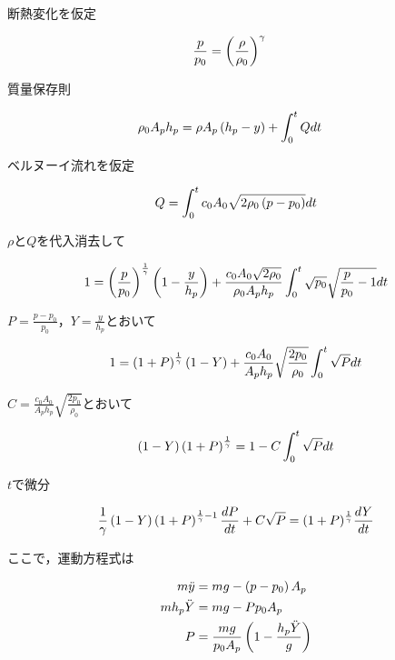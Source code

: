 \documentclass{jsarticle}
\begin{document}
断熱変化を仮定

\begin{align}
  \frac{p}{p_0} &= \left({\frac{\rho}{\rho_0}}\right)^{\gamma}  
\end{align}

質量保存則

\begin{align}
  \rho_0 A_p h_p &= \rho A_p \left({h_p - y}\right) + \int_0^t Q dt
\end{align}

ベルヌーイ流れを仮定

\begin{align}
  Q = \int_0^t c_0 A_0 \sqrt{2 \rho_0 \left({p - p_0}\right)} dt
\end{align}

$\rho$と$Q$を代入消去して

\begin{align}
  1 = \left({\frac{p}{p_0}}\right)^{\frac{1}{\gamma}} \left({1 - \frac{y}{h_p}}\right) + \frac{c_0 A_0 \sqrt{2 \rho_0}}{\rho_0 A_p h_p} \int_0^t \sqrt{p_0} \sqrt{\frac{p}{p_0} - 1} dt
\end{align}

$P = \frac{p - p_0}{p_0}$，$Y = \frac{y}{h_p}$とおいて

\begin{align}
  1 = \left({1 + P}\right)^{\frac{1}{\gamma}} \left({1 - Y}\right) + \frac{c_0 A_0}{A_p h_p} \sqrt{\frac{2 p_0}{\rho_0}} \int_0^t \sqrt{P} dt
\end{align}

$C = \frac{c_0 A_0}{A_p h_p} \sqrt{\frac{2 p_0}{\rho_0}}$とおいて

\begin{align}
  \left({1 - Y}\right) \left({1 + P}\right)^{\frac{1}{\gamma}} = 1 - C \int_0^t \sqrt{P} dt
\end{align}

$t$で微分

\begin{align}
  \frac{1}{\gamma} \left({1 - Y}\right) \left({1 + P}\right)^{\frac{1}{\gamma} - 1} \frac{dP}{dt} + C \sqrt{P} = (1 + P)^\frac{1}{\gamma} \frac{dY}{dt}
\end{align}

ここで，運動方程式は

\begin{align}
  m \ddot{y} &= m g - \left({p - p_0}\right) A_p \\
  m h_p \ddot{Y} &= m g - P p_0 A_p \\
  P &= \frac{mg}{p_0 A_p} \left({1 - \frac{h_p \ddot{Y}}{g}}\right) \\
\end{align}
\end{document}
